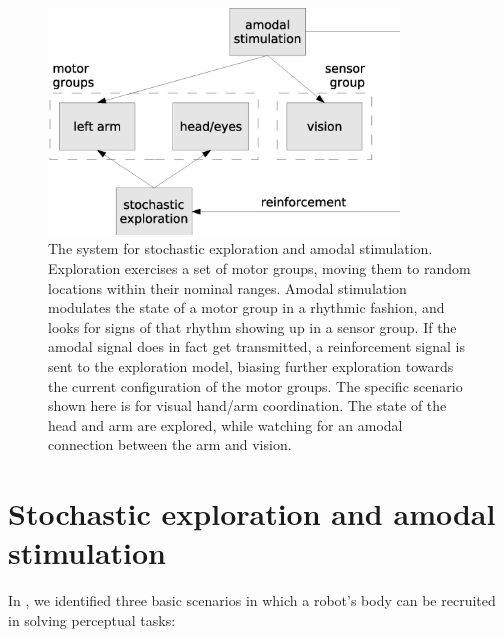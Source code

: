 
\begin{figure}[bt]
\centerline{\includegraphics[height=6cm]{images/amodal-modules}}
\caption {
%
\label{fig:amodal-module-vision}
%
The system for stochastic exploration and amodal stimulation.
Exploration exercises a set of motor groups, moving them
to random locations within their nominal ranges.
Amodal stimulation modulates the state of a motor group
in a rhythmic fashion, and looks for signs of that rhythm 
showing up in a sensor group. If the amodal signal does in
fact get transmitted, a reinforcement signal is sent to the
exploration model, biasing further exploration towards the
current configuration of the motor groups.
%
The specific scenario shown here is for visual hand/arm coordination.
The state of the head and arm are explored, while watching for
an amodal connection between the arm and vision.
%
}
\end{figure}

\section{Stochastic exploration and amodal stimulation}

\label{sect:motor-babble}



In , we identified three basic scenarios in
which a robot's body can be recruited in solving perceptual tasks:

